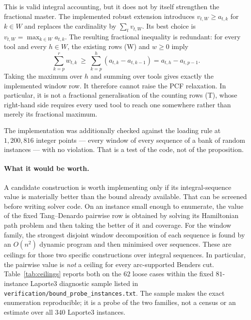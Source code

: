 This is valid integral accounting, but it does not by itself strengthen the
fractional master. The implemented robust extension introduces
$v_{t,W}\ge a_{t,k}$ for $k\in W$ and replaces the cardinality by
$\sum_t v_{t,W}$. Its best choice is
$v_{t,W}=\max_{k\in W}a_{t,k}$. The resulting fractional inequality is redundant:
for every tool and every $h\in W$, the existing rows (W) and $w\ge0$ imply
\[
 \sum_{k=p}^{r}w_{t,k}\ \ge\
 \sum_{k=p}^{h}(a_{t,k}-a_{t,k-1})
 =a_{t,h}-a_{t,p-1}.
\]
Taking the maximum over $h$ and summing over tools gives exactly the implemented
window row. It therefore cannot raise the PCF relaxation. In particular, it is not a
fractional generalisation of the counting rows (T), whose right-hand side requires
every used tool to reach one somewhere rather than merely its fractional maximum.

The implementation was additionally checked against the loading rule at $1{,}200{,}816$
integer points --- every window of every sequence of a bank of random instances --- with
no violation. That is a test of the code, not of the proposition.

\paragraph{What it would be worth.}
A candidate construction is worth implementing only if its integral-sequence value is
materially better than the bound already available. That can be screened before writing
solver code. On an instance small enough to enumerate, the value of the fixed
Tang--Denardo pairwise row is obtained by solving its Hamiltonian path problem and then
taking the better of it and coverage. For the window family, the strongest disjoint
window decomposition of each sequence is found by an $O(n^2)$ dynamic program and then
minimised over sequences. These are ceilings for those two specific constructions over
integral sequences. In particular, the pairwise value is \emph{not} a ceiling for every
arc-supported Benders cut.
Table~\ref{tab:ceilings} reports both on the $62$ loose cases within the fixed
$81$-instance Laporte3 diagnostic sample listed in
\texttt{verification/bound\_probe\_instances.txt}. The sample makes the exact
enumeration reproducible; it is a probe of the two families, not a census or an
estimate over all $340$ Laporte3 instances.

